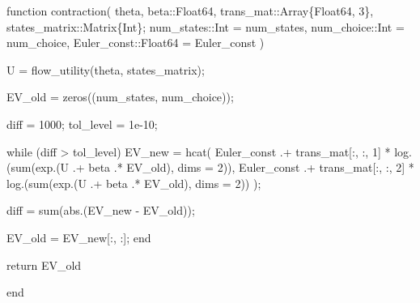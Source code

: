 \documentclass[
  letterpaper,
  DIV=11,
  numbers=noendperiod]{scrreprt}
\newenvironment{Shaded}{\begin{snugshade}}{\end{snugshade}}
\newcommand{\ControlFlowTok}[1]{\textcolor[rgb]{0.00,0.23,0.31}{#1}}
\newcommand{\DataTypeTok}[1]{\textcolor[rgb]{0.68,0.00,0.00}{#1}}
\newcommand{\FloatTok}[1]{\textcolor[rgb]{0.68,0.00,0.00}{#1}}
\newcommand{\FunctionTok}[1]{\textcolor[rgb]{0.28,0.35,0.67}{#1}}
\newcommand{\KeywordTok}[1]{\textcolor[rgb]{0.00,0.23,0.31}{#1}}
\newcommand{\NormalTok}[1]{\textcolor[rgb]{0.00,0.23,0.31}{#1}}
\newcommand{\OperatorTok}[1]{\textcolor[rgb]{0.37,0.37,0.37}{#1}}
\begin{document}
\begin{Shaded}
\begin{Highlighting}[]
\KeywordTok{function} \FunctionTok{contraction}\NormalTok{(}
\NormalTok{    theta,}
\NormalTok{    beta}\OperatorTok{::}\DataTypeTok{Float64}\NormalTok{,}
\NormalTok{    trans\_mat}\OperatorTok{::}\DataTypeTok{Array\{Float64, 3\}}\NormalTok{,}
\NormalTok{    states\_matrix}\OperatorTok{::}\DataTypeTok{Matrix\{Int\}}\NormalTok{;}
\NormalTok{    num\_states}\OperatorTok{::}\DataTypeTok{Int }\OperatorTok{=}\NormalTok{ num\_states,}
\NormalTok{    num\_choice}\OperatorTok{::}\DataTypeTok{Int }\OperatorTok{=}\NormalTok{ num\_choice,}
\NormalTok{    Euler\_const}\OperatorTok{::}\DataTypeTok{Float64 }\OperatorTok{=}\NormalTok{ Euler\_const}
\NormalTok{    )}

\NormalTok{    U }\OperatorTok{=} \FunctionTok{flow\_utility}\NormalTok{(theta, states\_matrix);}

\NormalTok{    EV\_old }\OperatorTok{=} \FunctionTok{zeros}\NormalTok{((num\_states, num\_choice));}

\NormalTok{    diff }\OperatorTok{=} \FloatTok{1000}\NormalTok{;}
\NormalTok{    tol\_level }\OperatorTok{=} \FloatTok{1e{-}10}\NormalTok{;}

    \ControlFlowTok{while}\NormalTok{ (diff }\OperatorTok{\textgreater{}}\NormalTok{ tol\_level)}
\NormalTok{        EV\_new }\OperatorTok{=} \FunctionTok{hcat}\NormalTok{(}
\NormalTok{            Euler\_const }\OperatorTok{.+}\NormalTok{ trans\_mat[}\OperatorTok{:}\NormalTok{, }\OperatorTok{:}\NormalTok{, }\FloatTok{1}\NormalTok{] }\OperatorTok{*} \FunctionTok{log}\NormalTok{.(}\FunctionTok{sum}\NormalTok{(}\FunctionTok{exp}\NormalTok{.(U }\OperatorTok{.+}\NormalTok{ beta }\OperatorTok{.*}\NormalTok{ EV\_old), dims }\OperatorTok{=} \FloatTok{2}\NormalTok{)),}
\NormalTok{            Euler\_const }\OperatorTok{.+}\NormalTok{ trans\_mat[}\OperatorTok{:}\NormalTok{, }\OperatorTok{:}\NormalTok{, }\FloatTok{2}\NormalTok{] }\OperatorTok{*} \FunctionTok{log}\NormalTok{.(}\FunctionTok{sum}\NormalTok{(}\FunctionTok{exp}\NormalTok{.(U }\OperatorTok{.+}\NormalTok{ beta }\OperatorTok{.*}\NormalTok{ EV\_old), dims }\OperatorTok{=} \FloatTok{2}\NormalTok{))}
\NormalTok{        );}

\NormalTok{        diff }\OperatorTok{=} \FunctionTok{sum}\NormalTok{(}\FunctionTok{abs}\NormalTok{.(EV\_new }\OperatorTok{{-}}\NormalTok{ EV\_old));}

\NormalTok{        EV\_old }\OperatorTok{=}\NormalTok{ EV\_new[}\OperatorTok{:}\NormalTok{, }\OperatorTok{:}\NormalTok{];}
    \ControlFlowTok{end}

    \ControlFlowTok{return}\NormalTok{ EV\_old}

\KeywordTok{end}
\end{Highlighting}
\end{Shaded}
\end{document}
